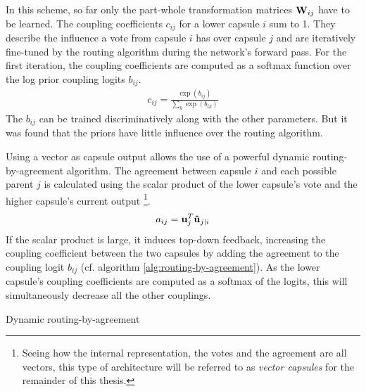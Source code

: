 In this scheme, so far only the part-whole transformation matrices $\vb{W}_{ij}$ have to be learned. The coupling coefficients $c_{ij}$ for a lower capsule $i$ sum to 1. They describe the influence a vote from capsule $i$ has over capsule $j$ and are iteratively fine-tuned by the routing algorithm during the network's forward pass. For the first iteration, the coupling coefficients are computed as a softmax function over the log prior coupling logits $b_{ij}$.
\begin{align}
    c_{ij} = \frac{\exp(b_{ij})}{\sum_k \exp(b_{ik})}
    \label{eq:coupling-coeff}
\end{align}
The $b_{ij}$ can be trained discriminatively along with the other parameters. But it was found that the priors have little influence over the routing algorithm.

Using a vector as capsule output allows the use of a powerful dynamic routing-by-agreement algorithm. The agreement between capsule $i$ and each possible parent $j$ is calculated using the scalar product of the lower capsule's vote and the higher capsule's current output \footnote{Seeing how the internal representation, the votes and the agreement are all vectors, this type of architecture will be referred to as \emph{vector capsules} for the remainder of this thesis.}.
\begin{align}
    a_{ij} = \vb{u}_j^T \vb{\hat{u}}_{j|i}
\end{align}
If the scalar product is large, it induces top-down feedback, increasing the coupling coefficient between the two capsules by adding the agreement to the coupling logit $b_{ij}$ (cf. algorithm \ref{alg:routing-by-agreement}). As the lower capsule's coupling coefficients are computed as a softmax of the logits, this will simultaneously decrease all the other couplings.
\begin{algorithm}
\caption{Dynamic routing-by-agreement}\label{alg:routing-by-agreement}
\begin{algorithmic}[1]
\EndFor
{}
  \EndFor
  \EndFor
  \EndFor
  \EndFor
\EndFor
{}
\EndProcedure
\end{algorithmic}
\end{algorithm}
